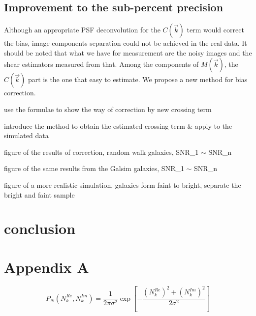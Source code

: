 \documentclass[twocolumn]{aastex62}
\begin{document}
\subsection{Improvement to the sub-percent precision}\label{sec:improve}
Although an appropriate PSF deconvolution for the $C(\vec{k})$ term would correct the bias, image components separation could not be achieved in the real data. It should be noted that what we have for measurement are the noisy images and the shear estimators measured from that. Among the components of $M(\vec{k})$, the $C(\vec{k})$ part is the one that easy to estimate. We propose a new method for bias correction. 

use the formulae to show the way of correction by new crossing term

introduce the method to obtain the estimated crossing term \& apply to the simulated data

figure of the results of correction, random walk galaxies, SNR\_1 $\sim$ SNR\_n

figure of the same results from the Galsim galaxies, SNR\_1 $\sim$ SNR\_n

figure of a more realistic simulation, galaxies form faint to bright, separate the bright and faint sample

\section{conclusion}
\appendix
\section{Appendix A}\label{app_a}
\begin{equation}
P_N(N_k^{Re},N_k^{Im})=\frac{1}{2\pi\sigma^2}\exp\left[-\frac{\left(N_k^{Re}\right)^2+\left(N_k^{Im}\right)^2}{2\sigma^2}\right]
\end{equation}
\end{document}
